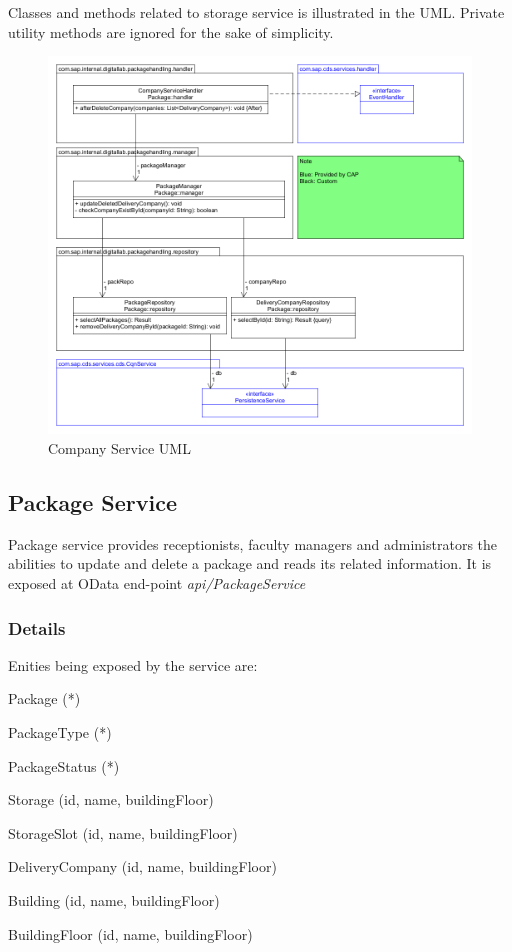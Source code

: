 Classes and methods related to storage service is illustrated in the UML. Private utility methods are ignored for the sake of simplicity.
\begin{figure}[!h]
    \centering
    \includegraphics[width=1\linewidth]{images/service_class_diagrams/company_service_class_diagram.png}
    \caption{Company Service UML}
    \label{fig:company_service_uml}
\end{figure}
\pagebreak

\subsection{Package Service}
Package service provides receptionists, faculty managers and administrators the abilities to update and delete a package and reads its related information. It is exposed at OData end-point \textit{api/PackageService} 

\subsubsection{Details}

Enities being exposed by the service are:
\begin{compactenum}
	\item Package (*)
    \item PackageType (*)
    \item PackageStatus (*)
    \item Storage (id, name, buildingFloor)
    \item StorageSlot (id, name, buildingFloor)
    \item DeliveryCompany (id, name, buildingFloor)
    \item Building (id, name, buildingFloor)
    \item BuildingFloor (id, name, buildingFloor)
\end{compactenum}

